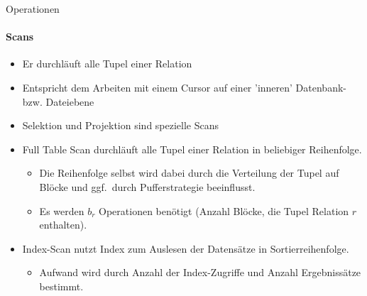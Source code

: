 \begin{frame}{Operationen}
\framesubtitle{Scans}
\begin{itemize}
\item Er durchläuft alle Tupel einer Relation
\item Entspricht dem Arbeiten mit einem Cursor auf einer 'inneren' Datenbank- bzw. Dateiebene
\item Selektion und Projektion sind spezielle Scans
\end{itemize}
\pause
\abs
{}
\begin{itemize}
\item Full Table Scan durchläuft alle Tupel einer Relation in beliebiger Reihenfolge. 
\begin{itemize}
	\item Die Reihenfolge selbst wird dabei durch die Verteilung der Tupel auf Blöcke und ggf.~durch Pufferstrategie beeinflusst. 
	\item Es werden $b_r$ Operationen benötigt (Anzahl Blöcke, die Tupel Relation $r$ enthalten).
\end{itemize}
\item Index-Scan nutzt Index zum Auslesen der Datens\"atze in Sortierreihenfolge. 
\begin{itemize}
	\item Aufwand wird durch Anzahl der Index-Zugriffe und Anzahl Ergebniss\"atze bestimmt.
\end{itemize}
\end{itemize}
\end{frame}

